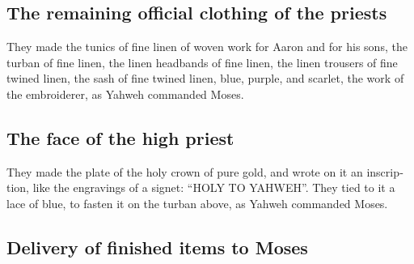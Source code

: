 \begin{paracol}{2}
\begin{otherlanguage}{english}
\hypertarget{the-remaining-official-clothing-of-the-priests}{%
\subsection{The remaining official clothing of the
priests}\label{the-remaining-official-clothing-of-the-priests}}

 They made the tunics of fine linen of woven work for
Aaron and for his sons,  the turban of fine linen, the
linen headbands of fine linen, the linen trousers of fine twined linen,
 the sash of fine twined linen, blue, purple, and
scarlet, the work of the embroiderer, as Yahweh commanded Moses.

\hypertarget{the-face-of-the-high-priest}{%
\subsection{The face of the high
priest}\label{the-face-of-the-high-priest}}

 They made the plate of the holy crown of pure gold, and
wrote on it an inscription, like the engravings of a signet: ``HOLY TO
YAHWEH''.  They tied to it a lace of blue, to fasten it
on the turban above, as Yahweh commanded Moses.

\hypertarget{delivery-of-finished-items-to-moses}{%
\subsection{Delivery of finished items to
Moses}\label{delivery-of-finished-items-to-moses}}


\end{otherlanguage}
\end{paracol}
